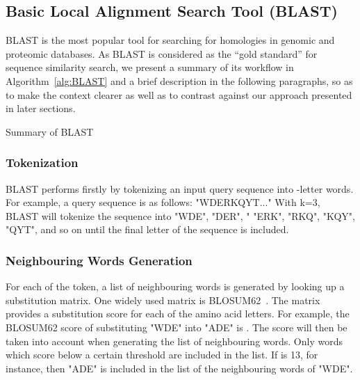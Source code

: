 \documentclass[titlepage]{csetr}
\begin{document}
\subsection{Basic Local Alignment Search Tool (BLAST)}

BLAST is the most popular tool for searching for homologies in genomic and proteomic databases. As BLAST is considered as the ``gold standard'' for sequence similarity search, we present a summary of its workflow in Algorithm~\ref{alg:BLAST} and a brief description in the following paragraphs, so as to make the context clearer as well as to contrast against our approach presented in later sections. 

\begin{algorithm}
 \caption{Summary of BLAST}
 \SetAlgoLined
  \ForAll{} {
    }
\label{alg:BLAST}
\end{algorithm}


\subsubsection{Tokenization}
BLAST performs firstly by tokenizing an input query sequence into -letter words. For example, a query sequence is as follows: "WDERKQYT..." With k=3, BLAST will tokenize the sequence into "WDE", "DER", " "ERK", "RKQ", "KQY", "QYT", and so on until the final letter of the sequence is included.

\subsubsection{Neighbouring Words Generation}
For each of the token, a list of neighbouring words is generated by looking up a substitution matrix. One widely used matrix is BLOSUM62~\cite{henikoff_amino_1992}. The matrix provides a substitution score for each of the amino acid letters. For example, the BLOSUM62 score of substituting "WDE" into "ADE" is . The score will then be taken into account when generating the list of neighbouring words. Only words which score below a certain threshold  are included in the list. If  is 13, for instance, then "ADE" is included in the list of the neighbouring words of "WDE".
\end{document}

